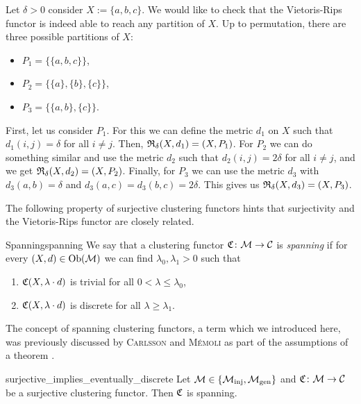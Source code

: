 \begin{example}{}{}
Let $\delta > 0$ consider $X := \{a,b,c\}$. We would like to check that the Vietoris-Rips functor is indeed able to reach any partition of $X$. Up to permutation, there are three possible partitions of $X$:
\begin{itemize}
    \item $P_1= \{\{a,b,c\}\}$,
    \item $P_2 = \{\{a\}, \{b\}, \{c\}\}$,
    \item $P_3 = \{\{a,b\}, \{c\}\}$.
\end{itemize}
First, let us consider $P_1$. For this we can define the metric $d_1$ on $X$ such that $d_1(i,j) = \delta$ for all $i \neq j$. Then, $\mathfrak{R}_\delta(X,d_1) = (X,P_1)$.
For $P_2$ we can do something similar and use the metric $d_2$ such that $d_2(i,j) = 2\delta$ for all $i \neq j$, and we get $\mathfrak{R}_\delta(X,d_2) = (X,P_2)$.
Finally, for $P_3$ we can use the metric $d_3$ with $d_3(a,b) = \delta$ and $d_3(a,c) = d_3(b,c) = 2\delta$. This gives us $\mathfrak{R}_\delta(X,d_3) = (X,P_3)$.
\end{example}

The following property of surjective clustering functors hints that surjectivity and the Vietoris-Rips functor are closely related.

\begin{definition}{Spanning}{spanning}
    We say that a clustering functor $\mathfrak{C}\colon \mathcal{M} \to \mathcal{C}$ is \emph{spanning} if for every ${(X,d) \in \mathrm {Ob}(\mathcal{M})}$ we can find $\lambda_0, \lambda_1 > 0$ such that
    \begin{enumerate}
        \item $\mathfrak{C}(X,\lambda \cdot d)$ is trivial for all $0 < \lambda \le \lambda_0$,
        \item $\mathfrak{C}(X,\lambda \cdot d)$ is discrete for all $\lambda \ge \lambda_1$.
    \end{enumerate}
\end{definition}

The concept of spanning clustering functors, a term which we introduced here, was previously discussed by \textsc{Carlsson} and \textsc{M\'emoli} as part of the assumptions of a theorem \cite[Thm.~6.4]{Carlsson2010}.

\begin{lemma}{}{surjective_implies_eventually_discrete}
    Let $\mathcal{M} \in \{{\mathcal{M}_\mathrm{inj}}, {\mathcal{M}_\mathrm{gen}}\}$ and $\mathfrak{C}\colon \mathcal{M} \to \mathcal{C}$ be a surjective clustering functor. Then $\mathfrak{C}$ is spanning.
\end{lemma}

